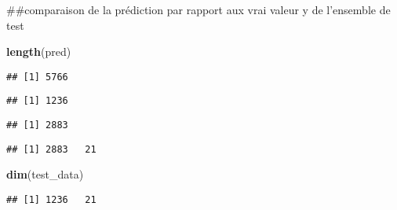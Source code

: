 \documentclass[
]{article}
\newenvironment{Shaded}{\begin{snugshade}}{\end{snugshade}}
\newcommand{\CommentTok}[1]{\textcolor[rgb]{0.56,0.35,0.01}{\textit{#1}}}
\newcommand{\FunctionTok}[1]{\textcolor[rgb]{0.13,0.29,0.53}{\textbf{#1}}}
\newcommand{\NormalTok}[1]{#1}
\newcommand{\SpecialCharTok}[1]{\textcolor[rgb]{0.81,0.36,0.00}{\textbf{#1}}}
\begin{document}
\#\#comparaison de la prédiction par rapport aux vrai valeur y de
l'ensemble de test

\begin{Shaded}
\begin{Highlighting}[]
\FunctionTok{length}\NormalTok{(pred)}
\end{Highlighting}
\end{Shaded}

\begin{verbatim}
## [1] 5766
\end{verbatim}

\begin{Shaded}
\end{Shaded}

\begin{verbatim}
## [1] 1236
\end{verbatim}

\begin{Shaded}
\end{Shaded}

\begin{verbatim}
## [1] 2883
\end{verbatim}

\begin{Shaded}
\end{Shaded}

\begin{verbatim}
## [1] 2883   21
\end{verbatim}

\begin{Shaded}
\begin{Highlighting}[]
\FunctionTok{dim}\NormalTok{(test\_data)}
\end{Highlighting}
\end{Shaded}

\begin{verbatim}
## [1] 1236   21
\end{verbatim}
\end{document}
